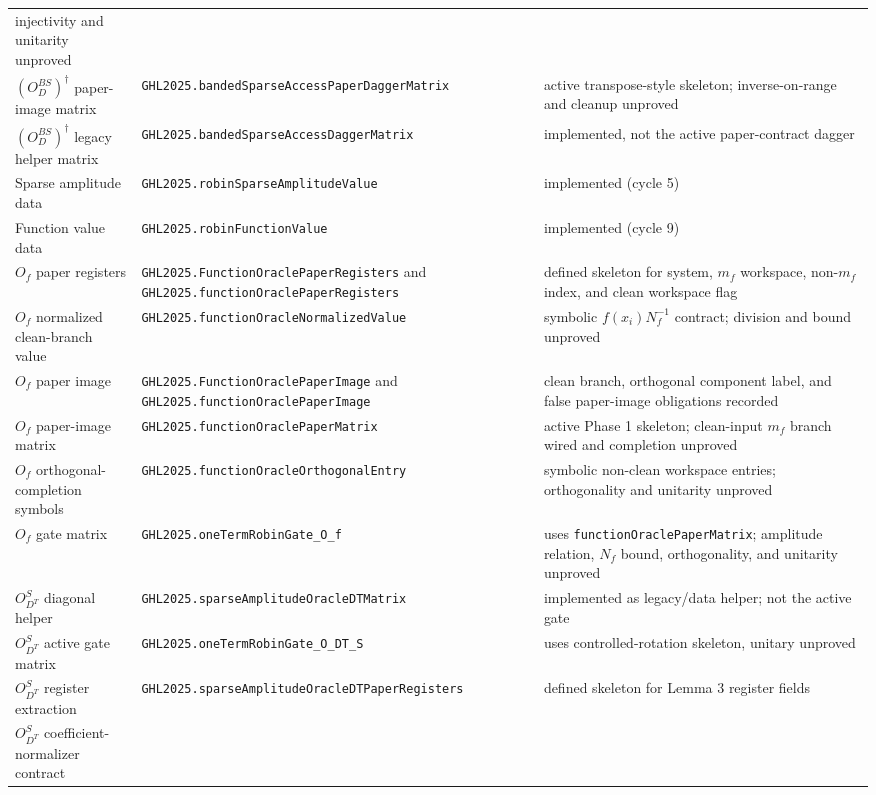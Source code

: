 \begin{center}
\begin{tabular}{lll}
injectivity and unitarity unproved \\
$(O_D^{BS})^\dagger$ paper-image matrix &
\texttt{GHL2025.bandedSparseAccessPaperDaggerMatrix} &
active transpose-style skeleton; inverse-on-range and cleanup unproved \\
$(O_D^{BS})^\dagger$ legacy helper matrix &
\texttt{GHL2025.bandedSparseAccessDaggerMatrix} &
implemented, not the active paper-contract dagger \\
Sparse amplitude data &
\texttt{GHL2025.robinSparseAmplitudeValue} &
implemented (cycle 5) \\
Function value data &
\texttt{GHL2025.robinFunctionValue} &
implemented (cycle 9) \\
$O_f$ paper registers &
\texttt{GHL2025.FunctionOraclePaperRegisters} and
\texttt{GHL2025.functionOraclePaperRegisters} &
defined skeleton for system, \(m_f\) workspace, non-\(m_f\) index, and clean
workspace flag \\
$O_f$ normalized clean-branch value &
\texttt{GHL2025.functionOracleNormalizedValue} &
symbolic \(f(x_i)N_f^{-1}\) contract; division and bound unproved \\
$O_f$ paper image &
\texttt{GHL2025.FunctionOraclePaperImage} and
\texttt{GHL2025.functionOraclePaperImage} &
clean branch, orthogonal component label, and false paper-image obligations
recorded \\
$O_f$ paper-image matrix &
\texttt{GHL2025.functionOraclePaperMatrix} &
active Phase 1 skeleton; clean-input \(m_f\) branch wired and completion
unproved \\
$O_f$ orthogonal-completion symbols &
\texttt{GHL2025.functionOracleOrthogonalEntry} &
symbolic non-clean workspace entries; orthogonality and unitarity unproved \\
$O_f$ gate matrix &
\texttt{GHL2025.oneTermRobinGate_O_f} &
uses \texttt{functionOraclePaperMatrix}; amplitude relation, \(N_f\) bound,
orthogonality, and unitarity unproved \\
$O_{D^T}^S$ diagonal helper &
\texttt{GHL2025.sparseAmplitudeOracleDTMatrix} &
implemented as legacy/data helper; not the active gate \\
$O_{D^T}^S$ active gate matrix &
\texttt{GHL2025.oneTermRobinGate_O_DT_S} &
uses controlled-rotation skeleton, unitary unproved \\
\(O_{D^T}^S\) register extraction &
\texttt{GHL2025.sparseAmplitudeOracleDTPaperRegisters} &
defined skeleton for Lemma 3 register fields \\
\(O_{D^T}^S\) coefficient-normalizer contract &

\end{tabular}
\end{center}
